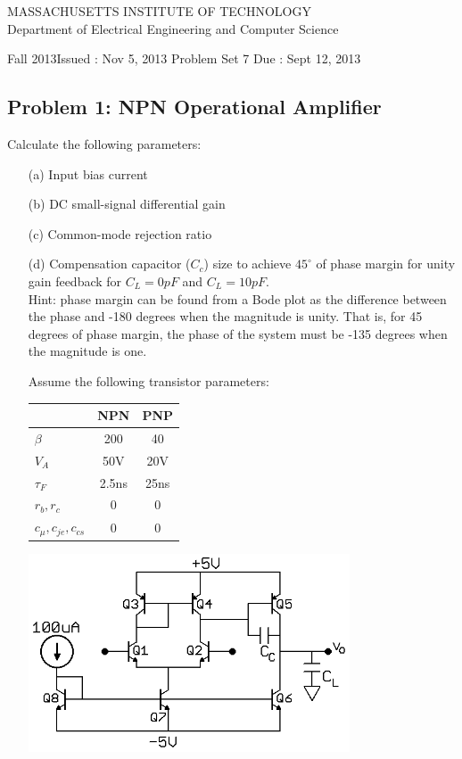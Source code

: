 \documentclass[11pt,twoside]{article}
\newlength{\toppush}
\newcommand{\htitle}[3]{\begin{center}
\vspace*{-\toppush}
{\large MASSACHUSETTS INSTITUTE OF TECHNOLOGY}\\
{\small Department of Electrical Engineering and Computer Science}\\
\vspace*{1ex}{\Large #2}\end{center}
\noindent
\newline\parbox{6.5in}
{Fall 2013\hfill Issued : #1 \newline
 Problem Set 7 \hfill Due : #3\newline
}}
\newcommand{\handout}[3]{\thispagestyle{empty}
\pagestyle{myheadings}\htitle{#1}{#2}{#3}}
\begin{document}
\handout{Nov 5, 2013}{6.301 Solid State Circuits}{Sept 12, 2013}
\setlength{\parindent}{0pt}

\newcommand{\solution}{
 \medskip
 {\bf Solution:}
}

\hrulefill

\flushleft

\subsection*{Problem 1: NPN Operational Amplifier}
Calculate the following parameters:
\begin{enumerate}
	\item[(a)] Input bias current
	\item[(b)] DC small-signal differential gain
	\item[(c)] Common-mode rejection ratio
	\item[(d)] Compensation capacitor ($C_c$) size to achieve $45^\circ$ of
	phase margin for unity gain feedback for $C_L = 0pF$ and $C_L = 10pF$. \\ 
Hint: phase margin can be found from a Bode plot as the difference between the phase and -180
degrees when the magnitude is unity. That is, for 45 degrees of phase margin, the phase of the
system must be -135 degrees when the magnitude is one.

\begin{center}
Assume the following transistor parameters: \\
\begin{tabular}{| l | c | c |}
\hline
 & NPN & PNP \\
\hline
\hline
$\beta$	& 200 & 40 \\
\hline
$V_A$	& 50V & 20V \\
\hline
$\tau_F$ & 2.5ns & 25ns \\
\hline
$r_b,r_c$ & 0 & 0 \\
\hline
$c_\mu, c_{je}, c_{cs}$ & 0 & 0 \\
\hline
\end{tabular}
\end{center}

\begin{center}
\includegraphics[width=0.75\textwidth]{npn-op.png}
\end{center}

\end{enumerate}
\clearpage
\end{document}
